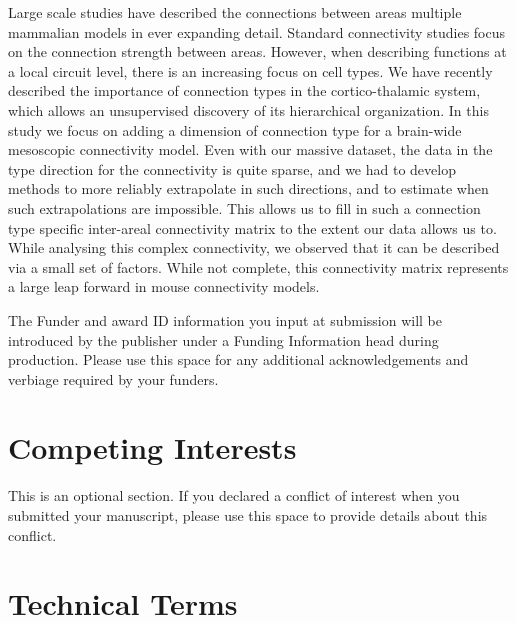 \documentclass[NETN,manuscript]{stjour-new}
\begin{document}
\begin{authorsummary}
Large scale studies have described the connections between areas multiple mammalian models in ever expanding detail. Standard connectivity studies focus on the connection strength between areas. However, when describing functions at a local circuit level, there is an increasing focus on cell types.  We have recently described the importance of connection types in the cortico-thalamic system, which allows an unsupervised discovery of its hierarchical organization. In this study we focus on adding a dimension of connection type for a brain-wide mesoscopic connectivity model. Even with our massive dataset, the data in the type direction for the connectivity is quite sparse, and we had to develop methods to more reliably extrapolate in such directions, and to estimate when such extrapolations are impossible. This allows us to fill in such a connection type specific inter-areal connectivity matrix to the extent our data allows us to. 
While analysing this complex connectivity, we observed that it can be described via a small set of factors. 
While not complete, this connectivity matrix represents a large leap forward in mouse connectivity models. 
\end{authorsummary}

\newpage


\newpage

\newpage

\newpage


\newpage

\acknowledgments
The Funder and award ID information you input at submission will be introduced by the publisher under a Funding Information head during production.
Please use this space for any additional acknowledgements and verbiage required by your funders.
\newpage


\newpage
\section{Competing Interests}
\label{sec:comp}
This is an optional section. If you declared a conflict of interest when you submitted your manuscript, please  use this space to provide details about this conflict.

\newpage


\newpage
\section{Technical Terms}
\end{document}
